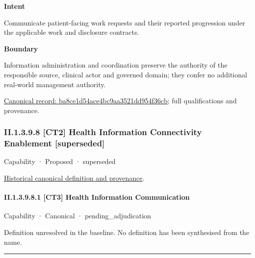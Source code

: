 \textbf{Intent}



Communicate patient-facing work requests and their reported progression under the applicable work and disclosure contracts.



\textbf{Boundary}



Information administration and coordination preserve the authority of the responsible source, clinical actor and governed domain; they confer no additional real-world management authority.


{\footnotesize \href{../../../../../../../continuum/strategy/capability/ba8ce1d54ace4bc9aa3521dd954f36cb.md}{Canonical record: ba8ce1d54ace4bc9aa3521dd954f36cb}; full qualifications and provenance.}\par
\subsubsection*{II.1.3.9.8 [CT2] Health Information Connectivity Enablement [superseded]}
\label{navigation:II.1.3.9.8}

\label{element:6a1030483dfc4ae6af6998b587129d1c}
{\small Capability · Proposed · superseded}\par
\href{../../../../../../../continuum/strategy/capability/6a1030483dfc4ae6af6998b587129d1c.md}{Historical canonical definition and provenance}.\par
\paragraph*{II.1.3.9.8.1 [CT3] Health Information Communication}
\label{navigation:II.1.3.9.8.1}

\label{element:9794b2aff43443b495a19aefe0efa67b}
{\small Capability · Canonical · pending\_adjudication}\par

Definition unresolved in the baseline. No definition has been synthesised from the name.



\medskip\hrule\medskip

